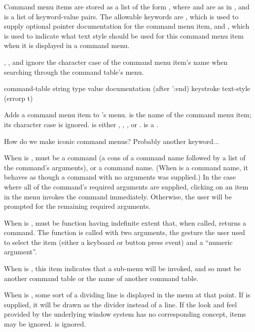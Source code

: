 Command menu items are stored as a list of the form
, where  and 
are as in , and  is a list of
keyword-value pairs.  The allowable keywords are , which is
used to supply optional pointer documentation for the command menu item, and
, which is used to indicate what text style should be used for
this command menu item when it is displayed in a command menu.

, ,
and  ignore the character case of the command menu item's
name when searching through the command table's menu.


 {command-table string type value 
                                         \key documentation (after ':end) keystroke
                                              text-style (errorp t)}

Adds a command menu item to 's menu.   is the
name of the command menu item; its character case is ignored.   is
either , , , or .
 is a .

 {How do we make iconic command menus?  Probably another keyword...}

When  is ,  must be a command (a cons of a
command name followed by a list of the command's arguments), or a command name.
(When  is a command name, it behaves as though a command with no
arguments was supplied.)  In the case where all of the command's required
arguments are supplied, clicking on an item in the menu invokes the command
immediately.  Otherwise, the user will be prompted for the remaining required
arguments.

When  is ,  must be function having
indefinite extent that, when called, returns a command.  The function is called
with two arguments, the gesture the user used to select the item (either a
keyboard or button press event) and a ``numeric argument''.

When  is , this item indicates that a sub-menu will be
invoked, and so  must be another command table or the name of
another command table.

When  is , some sort of a dividing line is displayed in
the menu at that point.  If  is supplied, it will be drawn as the
divider instead of a line.  If the look and feel provided by the underlying
window system has no corresponding concept,  items may be ignored.
 is ignored.

